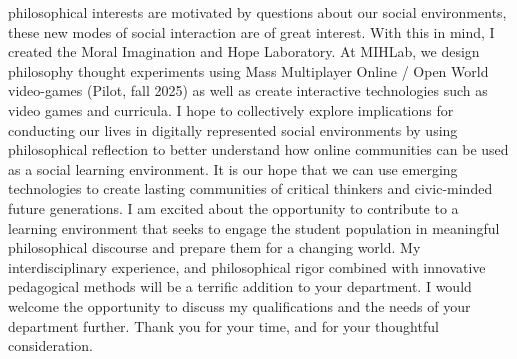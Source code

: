\documentclass[
  letterpaper,
  DIV=11,
  numbers=noendperiod]{scrartcl}
\begin{document}
philosophical interests are motivated by questions about our social
environments, these new modes of social interaction are of great
interest. With this in mind, I created the Moral Imagination and Hope
Laboratory. At MIHLab, we design philosophy thought experiments using
Mass Multiplayer Online / Open World video-games (Pilot, fall 2025) as
well as create interactive technologies such as video games and
curricula. I hope to collectively explore implications for conducting
our lives in digitally represented social environments by using
philosophical reflection to better understand how online communities can
be used as a social learning environment. It is our hope that we can use
emerging technologies to create lasting communities of critical thinkers
and civic-minded future generations. I am excited about the opportunity
to contribute to a learning environment that seeks to engage the student
population in meaningful philosophical discourse and prepare them for a
changing world. My interdisciplinary experience, and philosophical rigor
combined with innovative pedagogical methods will be a terrific addition
to your department. I would welcome the opportunity to discuss my
qualifications and the needs of your department further. Thank you for
your time, and for your thoughtful consideration.
\end{document}
